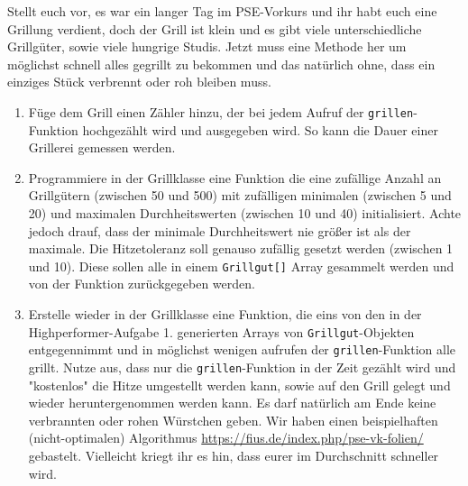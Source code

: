 \documentclass{../../sheet}
\begin{document}
\newpage
{}
Stellt euch vor, es war ein langer Tag im PSE-Vorkurs und ihr habt euch eine Grillung verdient, doch der Grill ist klein und es gibt viele unterschiedliche Grillgüter, sowie viele hungrige Studis. Jetzt muss eine Methode her um möglichst schnell alles gegrillt zu bekommen und das natürlich ohne, dass ein einziges Stück verbrennt oder roh bleiben muss.
\begin{enumerate}
    \item Füge dem Grill einen Zähler hinzu, der bei jedem Aufruf der \texttt{grillen}-Funktion hochgezählt wird und ausgegeben wird. So kann die Dauer einer Grillerei gemessen werden.
    \item Programmiere in der Grillklasse eine Funktion die eine zufällige Anzahl an Grillgütern (zwischen 50 und 500) mit zufälligen minimalen (zwischen 5 und 20) und maximalen Durchheitswerten (zwischen 10 und 40) initialisiert. Achte jedoch drauf, dass der minimale Durchheitswert nie größer ist als der maximale. Die Hitzetoleranz soll genauso zufällig gesetzt werden (zwischen 1 und 10). Diese sollen alle in einem \texttt{Grillgut[]} Array gesammelt werden und von der Funktion zurückgegeben werden. 
    \item Erstelle wieder in der Grillklasse eine Funktion, die eins von den in der Highperformer-Aufgabe 1. generierten Arrays von \texttt{Grillgut}-Objekten entgegennimmt und in möglichst wenigen aufrufen der \texttt{grillen}-Funktion alle grillt. Nutze aus, dass nur die \texttt{grillen}-Funktion in der Zeit gezählt wird und "kostenlos" die Hitze umgestellt werden kann, sowie auf den Grill gelegt und wieder heruntergenommen werden kann. Es darf natürlich am Ende keine verbrannten oder rohen Würstchen geben. Wir haben einen beispielhaften (nicht-optimalen) Algorithmus \url{https://fius.de/index.php/pse-vk-folien/} gebastelt. Vielleicht kriegt ihr es hin, dass eurer im Durchschnitt schneller wird.
\end{enumerate}
\end{document}
